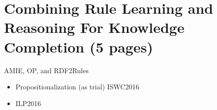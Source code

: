 \section{Combining Rule Learning and Reasoning For Knowledge Completion (5 pages)}
\label{sec:rules_kg_completion}



AMIE, OP, and RDF2Rules

\begin{itemize}
\item Propositionalization (as trial) ISWC2016
\item ILP2016

\end{itemize}


